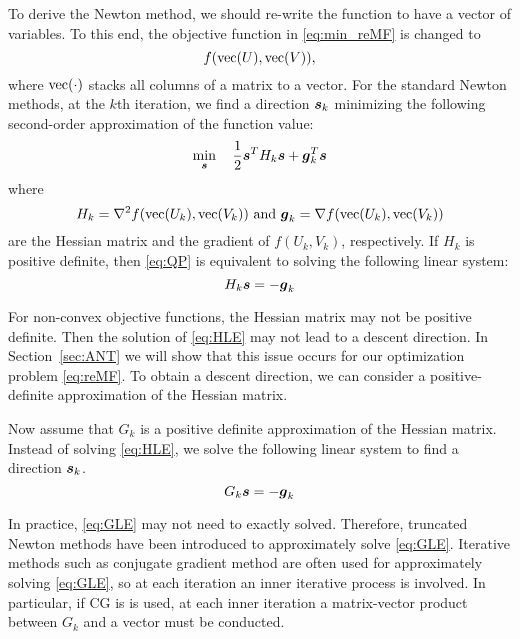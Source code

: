 \label{sec:NewtonMin}
To derive the Newton method, we should re-write the function to have a vector of variables. To this end, the objective function in \eqref{eq:min_reMF} is changed to 
\begin{equation*}
f(\operatorname*{vec}(U), \operatorname*{vec}(V)),
\end{equation*}
where $\operatorname*{vec}(\cdot)$ stacks all columns of a matrix to a vector.
For the standard Newton methods, at the $k$th iteration, we find a direction $\boldsymbol{s}_k$ minimizing the following second-order approximation of the function value:
\begin{equation}
    \min_{\boldsymbol{s}} \quad \frac{1}{2}\boldsymbol{s}^T H_k \boldsymbol{s} + \boldsymbol{g}_k^T \boldsymbol{s}
\label{eq:QP}
\end{equation}
where 
\begin{equation*}
H_k = \nabla^2 f(\operatorname*{vec}(U_k), \operatorname*{vec}(V_k))\text{ and }
\boldsymbol{g}_k = \nabla f(\operatorname*{vec}(U_k), \operatorname*{vec}(V_k))
\end{equation*}
are the Hessian matrix and the gradient of $f(U_k, V_k)$, respectively.
If $H_k$ is positive definite, then \eqref{eq:QP} is equivalent to solving the following linear system:
\begin{equation}
    H_k\boldsymbol{s} = -\boldsymbol{g}_k
\label{eq:HLE}
\end{equation}

For non-convex objective functions, the Hessian matrix may not be positive definite. Then the solution of \eqref{eq:HLE} may not lead to a descent direction. In Section~\ref{sec:ANT} we will show that this issue occurs for our optimization problem \eqref{eq:reMF}. To obtain a descent direction, we can consider a positive-definite approximation of the Hessian matrix.

\par Now assume that $G_k$ is a positive definite approximation of the Hessian matrix. Instead of solving \eqref{eq:HLE}, we solve the following linear system to find a direction $\boldsymbol{s}_k$.
\begin{equation}
	G_k\boldsymbol{s} = -\boldsymbol{g}_k
\label{eq:GLE}
\end{equation}

In practice, \eqref{eq:GLE} may not need to exactly solved. Therefore, truncated Newton methods have been introduced to approximately solve \eqref{eq:GLE}. Iterative methods such as conjugate gradient method are often used for approximately solving \eqref{eq:GLE}, so at each iteration an inner iterative process is involved. In particular, if CG is is used, at each inner iteration a matrix-vector product between $G_k$ and a vector must be conducted.

